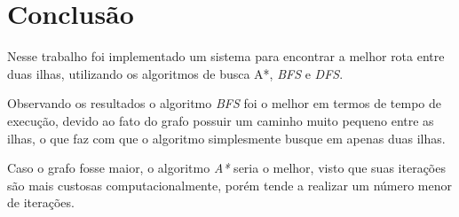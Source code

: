 \documentclass[12pt, a4paper]{article}
\begin{document}
\section{Conclusão}\label{sec:concl}
Nesse trabalho foi implementado um sistema para encontrar a melhor rota entre duas ilhas,
utilizando os algoritmos de busca A*, \textit{BFS} e \textit{DFS}.

Observando os resultados o algoritmo \textit{BFS} foi o melhor em termos de tempo de execução,
devido ao fato do grafo possuir um caminho muito pequeno entre as ilhas,
o que faz com que o algoritmo simplesmente busque em apenas duas ilhas.

Caso o grafo fosse maior, o algoritmo \textit{A*} seria o melhor,
visto que suas iterações são mais custosas computacionalmente,
porém tende a realizar um número menor de iterações.


\end{document}
